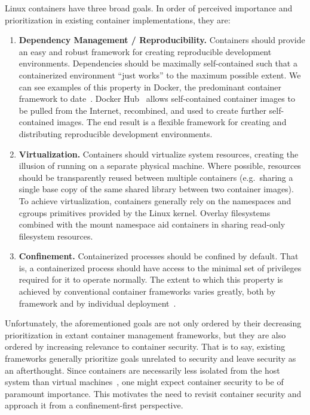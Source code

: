 Linux containers have three broad goals. In order of perceived importance and prioritization in existing
container implementations, they are:
\begin{enumerate}
  \item \textbf{Dependency Management / Reproducibility.}
    Containers should provide an easy and robust framework for creating reproducible
    development environments. Dependencies should be maximally self-contained such that
    a containerized environment \enquote{just works} to the maximum possible extent. We
    can see examples of this property in Docker, the predominant container framework to
    date~. Docker Hub~ allows self-contained container images to be
    pulled from the Internet, recombined, and used to create further self-contained
    images. The end result is a flexible framework for creating and distributing reproducible
    development environments.

  \item \textbf{Virtualization.}
    Containers should virtualize system resources, creating the illusion of running on
    a separate physical machine. Where possible, resources should be transparently reused
    between multiple containers (e.g.~sharing a single base copy of the same shared
    library between two container images). To achieve virtualization, containers generally
    rely on the namespaces and cgroups primitives provided by the Linux kernel. Overlay
    filesystems~ combined with the mount namespace aid containers in sharing
    read-only filesystem resources.

  \item \textbf{Confinement.}
    Containerized processes should be confined by default. That is, a containerized
    process should have access to the minimal set of privileges required for it to operate
    normally. The extent to which this property is achieved by conventional container
    frameworks varies greatly, both by framework and by individual
    deployment~\cite{sultan2019_container_security, xin2018_container_security,
    bui2015_docker_analysis}.
\end{enumerate}

Unfortunately, the aforementioned goals are not only ordered by their decreasing
prioritization in extant container management frameworks, but they are also ordered by
increasing relevance to container security. That is to say, existing frameworks generally
prioritize goals unrelated to security and leave security as an afterthought. Since
containers are necessarily less isolated from the host system than virtual
machines~\cite{sultan2019_container_security, eder2016_hypervisor_container}, one might
expect container security to be of paramount importance. This motivates the need to
revisit container security and approach it from a confinement-first perspective.

